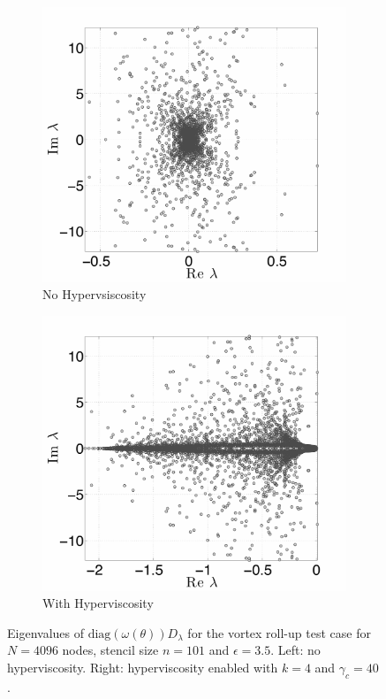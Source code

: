 \documentclass{report}
\begin{document}
\begin{figure}[htb]
\begin{center}
\begin{subfigure}[b]{0.45\textwidth}
	\centering
	\includegraphics[width=1.0\textwidth]{../figures/paper1/figures/vortex_rollup/eigs_N4096_n101_noHV.pdf}
	\caption{No Hypervsiscosity}
	\label{fig:vortex_eigs_nohv}
\end{subfigure}
\begin{subfigure}[b]{0.45\textwidth}
	\centering
	\includegraphics[width=1.0\textwidth]{../figures/paper1/figures/vortex_rollup/eigs_N4096_n101_HV_k4_gamma40.pdf}
	\caption{With Hyperviscosity}
	\label{fig:vortex_eigs_hv}
\end{subfigure}
\caption{Eigenvalues of $\text{diag}(\omega(\theta)) D_\lambda$ for the vortex roll-up test case for $N=4096$ nodes, stencil size $n=101$ and $\epsilon = 3.5$. Left: no hyperviscosity. Right: hyperviscosity enabled with $k=4$ and $\gamma_c = 40$. }
\label{fig:eig_vortex}
\end{center}
\end{figure}
\end{document}
